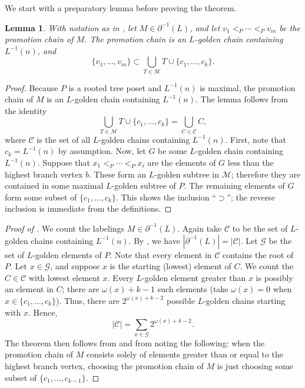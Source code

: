 \documentclass[11pt]{amsart}
\newtheorem{lemma}[thm]{Lemma}
\theoremstyle{definition}
\newcommand{\inverse}{^{-1}}
\begin{document}
We start with a preparatory lemma before proving the theorem. 
\begin{lemma}\label{golden partition}
	With notation as in , let $ M\in\partial\inverse(L) $, and let $ v_1<_P\cdots<_Pv_m $ be the promotion chain of $ M $. The promotion chain is an $ L $-golden chain containing $ L\inverse(n) $, and \[\{v_1,\ldots,v_m\}\subset\bigcup_{T\in\mathcal{M}}T\cup\{c_1,\ldots,c_k\}.\]
\end{lemma}
\begin{proof}
	Because $ P $ is a rooted tree poset and $ L\inverse(n) $ is maximal, the promotion chain of $ M $ is an $ L $-golden chain containing $ L\inverse(n) $. The lemma follows from the identity \[\bigcup_{T\in\mathcal{M}}T\cup\{c_1,\ldots,c_k\}=\bigcup_{C\in\mathcal{C}}C,\] where $ \mathcal{C} $ is the set of all $ L $-golden chains containing $ L\inverse(n) $. First, note that $ c_k=L\inverse(n) $ by assumption. Now, let $ G $ be some $ L $-golden chain containing $ L\inverse(n) $. Suppose that $ x_1<_P\cdots<_Px_i $ are the elements of $ G $ less than the highest branch vertex $ b $. These form an $ L $-golden subtree in $ \mathcal{M} $; therefore they are contained in some maximal $ L $-golden subtree of $ P $. The remaining elements of $ G $ form some subset of $ \{c_1,\ldots,c_k\} $. This shows the inclusion ``$ \supset $''; the reverse inclusion is immediate from the definitions. 
\end{proof}
\begin{proof}[Proof of ]
	We count the labelings $ M\in\partial\inverse(L) $. Again take $ \mathcal{C} $ to be the set of $ L $-golden chains containing $ L\inverse(n) $. By , we have $ |\partial\inverse(L)|=|\mathcal{C}|. $ Let $ \mathcal{G} $ be the set of $ L $-golden elements of $ P $. Note that every element in $ \mathcal{C} $ contains the root of $ P $. Let $ x\in\mathcal{G} $, and suppose $ x $ is the starting (lowest) element of $ C $. We count the $ C\in\mathcal{C} $ with lowest element $ x $. Every $ L $-golden element greater than $ x $ is possibly an element in $ C $; there are $ \omega(x)+k-1 $ such elements (take $ \omega(x)=0 $ when $ x\in\{c_1,\ldots,c_k\} $). Thus, there are $ 2^{\omega(x)+k-2} $ possible $ L $-golden chains starting with $ x $. Hence, \[|\mathcal{C}|=\sum_{x\in\mathcal{G}}2^{\omega(x)+k-2}.\]
	The theorem then follows from  and from noting the following: when the promotion chain of $ M $ consists solely of elements greater than or equal to the highest branch vertex, choosing the promotion chain of $ M $ is just choosing some subset of $ \{c_1,\ldots,c_{k-1}\} $. 
\end{proof}
\end{document}
